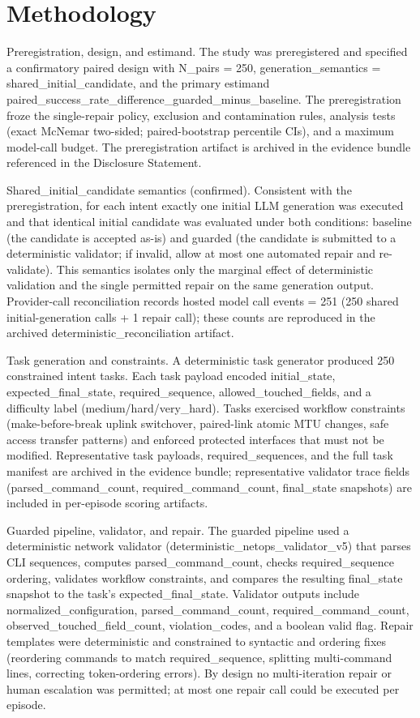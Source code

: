 \documentclass[conference]{IEEEtran}
\begin{document}
\section{Methodology}
Preregistration, design, and estimand. The study was preregistered and specified a confirmatory paired design with N\_pairs = 250, generation\_semantics = shared\_initial\_candidate, and the primary estimand paired\_success\_rate\_difference\_guarded\_minus\_baseline. The preregistration froze the single-repair policy, exclusion and contamination rules, analysis tests (exact McNemar two-sided; paired-bootstrap percentile CIs), and a maximum model-call budget. The preregistration artifact is archived in the evidence bundle referenced in the Disclosure Statement.

Shared\_initial\_candidate semantics (confirmed). Consistent with the preregistration, for each intent exactly one initial LLM generation was executed and that identical initial candidate was evaluated under both conditions: baseline (the candidate is accepted as-is) and guarded (the candidate is submitted to a deterministic validator; if invalid, allow at most one automated repair and re-validate). This semantics isolates only the marginal effect of deterministic validation and the single permitted repair on the same generation output. Provider-call reconciliation records hosted model call events = 251 (250 shared initial-generation calls + 1 repair call); these counts are reproduced in the archived deterministic\_reconciliation artifact.

Task generation and constraints. A deterministic task generator produced 250 constrained intent tasks. Each task payload encoded initial\_state, expected\_final\_state, required\_sequence, allowed\_touched\_fields, and a difficulty label (medium/hard/very\_hard). Tasks exercised workflow constraints (make-before-break uplink switchover, paired-link atomic MTU changes, safe access transfer patterns) and enforced protected interfaces that must not be modified. Representative task payloads, required\_sequences, and the full task manifest are archived in the evidence bundle; representative validator trace fields (parsed\_command\_count, required\_command\_count, final\_state snapshots) are included in per-episode scoring artifacts.

Guarded pipeline, validator, and repair. The guarded pipeline used a deterministic network validator (deterministic\_netops\_validator\_v5) that parses CLI sequences, computes parsed\_command\_count, checks required\_sequence ordering, validates workflow constraints, and compares the resulting final\_state snapshot to the task's expected\_final\_state. Validator outputs include normalized\_configuration, parsed\_command\_count, required\_command\_count, observed\_touched\_field\_count, violation\_codes, and a boolean valid flag. Repair templates were deterministic and constrained to syntactic and ordering fixes (reordering commands to match required\_sequence, splitting multi-command lines, correcting token-ordering errors). By design no multi-iteration repair or human escalation was permitted; at most one repair call could be executed per episode.
\end{document}

